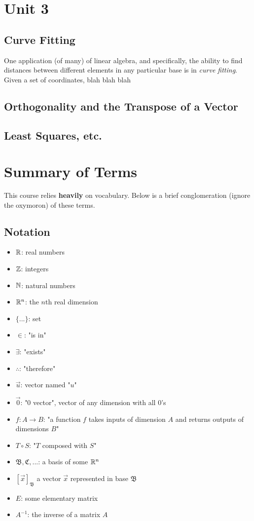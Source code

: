 \documentclass[12pt]{article}
\begin{document}
\section{Unit 3}

\subsection{Curve Fitting}

One application (of many) of linear algebra, and specifically, the ability to find distances between different elements in any particular base is in \textit{curve fitting}. Given a set of coordinates, blah blah blah

\subsection{Orthogonality and the Transpose of a Vector}

\subsection{Least Squares, etc.}

\newpage
\section{Summary of Terms}
This course relies \textbf{heavily} on vocabulary. Below is a brief conglomeration (ignore the oxymoron) of these terms.

\subsection{Notation}
    \begin{itemize}
        \item $\mathbb{R}$: real numbers
        \item $\mathbb{Z}$: integers
        \item $\mathbb{N}$: natural numbers
        \item $\mathbb{R}^n$: the $n$th real dimension
        \item $\{...\}$: set
        \item $\in$: "is in"
        \item $\exists$: "exists"
        \item $\therefore$: "therefore"
        \item $\Vec{u}$: vector named "$u$"
        \item $\Vec{0}$: "0 vector", vector of any dimension with all $0$'s
        \item $f: A \to B$: "a function $f$ takes inputs of dimension $A$ and returns outputs of dimensions $B$"
        \item $T \circ S$: "$T$ composed with $S$"
        \item $\mathfrak{B}, \mathfrak{C}, ...$: a basis of some $\mathbb{R}^n$
        \item $[\vec{x}]_{\mathfrak{B}}$ a vector $\vec{x}$ represented in base $\mathfrak{B}$
        \item $E$: some elementary matrix
       \item $A^{-1}$: the inverse of a matrix $A$
    \end{itemize}
\end{document}
